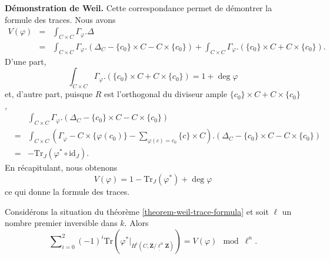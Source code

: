 \medskip\noindent
{\bf Démonstration de Weil.} Cette correspondance permet de démontrer la formule
des traces. Nous avons
\begin{eqnarray*}
V(\varphi) & = & \int_{C \times C} \Gamma_\varphi.\Delta \\
& = & \int_{C \times C} \Gamma_\varphi. \left(\Delta_C - \{c_0\} \times C - C
\times \{c_0\}\right) + \int_{C \times C} \Gamma_\varphi. \left(\{c_0\} \times C
+ C \times \{c_0\}\right).
\end{eqnarray*}
D'une part,
$$
\int_{C \times C} \Gamma_\varphi. \left(\{c_0\} \times C + C \times
\{c_0\}\right)
=
1 + \deg \varphi
$$
et, d'autre part, puisque $R$ est l'orthogonal du diviseur ample
$\{c_0\} \times C + C \times \{c_0\}$,
\begin{eqnarray*}
& &
\int_{C \times C} \Gamma_\varphi. \left(\Delta_C - \{c_0\} \times C - C \times
\{c_0\}\right) \\
& = &
\int_{C \times C} \left(\Gamma_\varphi - C \times \{\varphi(c_0)\} -
\sum_{\varphi(c) = c_0} \{c\} \times C \right). \left(\Delta_C - \{c_0\} \times
C - C \times \{c_0\}\right) \\
& = & - \text{Tr}_J (\varphi^* \circ \text{id}_J).
\end{eqnarray*}
En récapitulant, nous obtenons
$$
V(\varphi) = 1 - \text{Tr}_J (\varphi^*) + \deg \varphi
$$
ce qui donne la formule des traces.

\begin{lemma}
\label{lemma-weil-mod}
Considérons la situation du
théorème \ref{theorem-weil-trace-formula}
et soit $\ell$ un nombre premier inversible dans $k$. Alors
$$
\sum\nolimits_{i = 0}^2
(-1)^i
\text{Tr}(\varphi^* |_{H^i (C, \underline{\mathbf{Z}/\ell^n \mathbf{Z}})})
=
V(\varphi) \mod \ell^n.
$$
\end{lemma}

